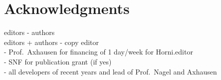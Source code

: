 \section*{Acknowledgments}
editors - authors \\
editors + authors - copy editor \\
- Prof.\ Axhausen for financing of 1 day/week for Horni.editor\\
- SNF for publication grant (if yes) \\
- all developers of recent years and lead of Prof.\ Nagel and Axhausen

